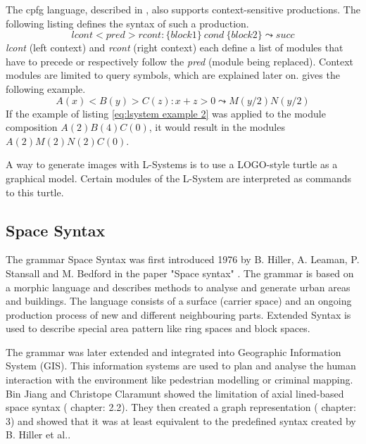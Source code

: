 \documentclass[11pt, a4paper]{report}
\begin{document}
The cpfg language, described in \citep{PrusinkiewiczEtAl:2001}, also supports context-sensitive productions. The following listing defines the syntax of such a production.
\begin{equation} \label{eq:lsystem context sensitive}
    lcont < pred > rcont : \{block1\}\ cond\ \{block2\} \leadsto succ
\end{equation}
\textit{lcont} (left context) and \textit{rcont} (right context) each define a list of modules that have to precede or respectively follow the \textit{pred} (module being replaced). Context modules are limited to query symbols, which are explained later on. \citep{PrusinkiewiczEtAl:2001} gives the following example.
\begin{equation} \label{eq:lsystem example 2}
    A(x) < B(y) > C(z) : x + z > 0 \leadsto M(y / 2)N(y / 2)
\end{equation}
If the example of listing \ref{eq:lsystem example 2} was applied to the module composition $A(2)B(4)C(0)$, it would result in the modules $A(2)M(2)N(2)C(0)$.

A way to generate images with L-Systems is to use a LOGO-style turtle as a graphical model. Certain modules of the L-System are interpreted as commands to this turtle.

\pagebreak
\subsection{Space Syntax}
The grammar Space Syntax was first introduced 1976 by B. Hiller, A. Leaman, P. Stansall and M. Bedford in the paper "Space syntax" \citep{spaceSyntax:1976}. The grammar is based on a morphic language and describes methods to analyse and generate urban areas and buildings.
The language consists of a surface (carrier space) and an ongoing production process of new and different neighbouring parts. Extended Syntax is used to describe special area pattern like ring spaces and block spaces.

The grammar was later extended and integrated into Geographic Information System (GIS). This information systems are used to plan and analyse the human interaction with the environment like pedestrian modelling or criminal mapping.
Bin Jiang and Christope Claramunt \citep{integrationSpaceSyntaxGIS:2002} showed the limitation of axial lined-based space syntax (\citep{integrationSpaceSyntaxGIS:2002} chapter: 2.2). They then created a graph representation (\citep{integrationSpaceSyntaxGIS:2002} chapter: 3) and showed that it was at least equivalent to the predefined syntax created by B. Hiller et al.\citep{spaceSyntax:1976}.
\end{document}
